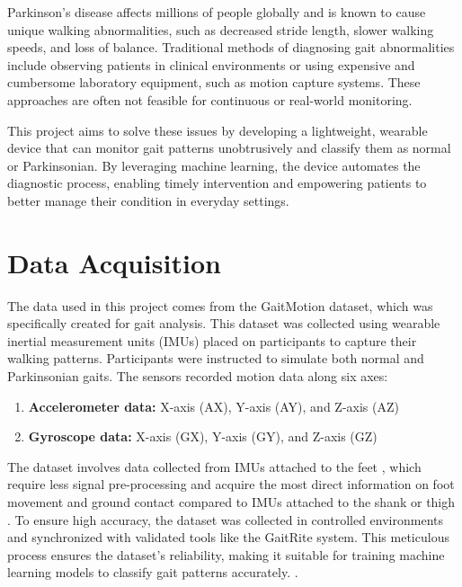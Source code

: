 Parkinson’s disease affects millions of people globally and is known to cause unique walking abnormalities, such as decreased stride length, slower walking speeds, and loss of balance.\cite{Hausdorff:2009} Traditional methods of diagnosing gait abnormalities include observing patients in clinical environments or using expensive and cumbersome laboratory equipment, such as motion capture systems. These approaches are often not feasible for continuous or real-world monitoring.\cite{ZhangWenwen:2022}

This project aims to solve these issues by developing a lightweight, wearable device that can monitor gait patterns unobtrusively and classify them as normal or Parkinsonian. By leveraging machine learning, the device automates the diagnostic process, enabling timely intervention and empowering patients to better manage their condition in everyday settings.\cite{Panebianco:2018}


\section{Data Acquisition}

The data used in this project comes from the GaitMotion dataset, which was specifically created for gait analysis. This dataset was collected using wearable inertial measurement units (IMUs) placed on participants to capture their walking patterns. Participants were instructed to simulate both normal and Parkinsonian gaits. The sensors recorded motion data along six axes:
\begin{enumerate}
	
	\item \textbf{Accelerometer data:} X-axis (AX), Y-axis (AY), and Z-axis (AZ)
	\item \textbf{Gyroscope data:} X-axis (GX), Y-axis (GY), and Z-axis (GZ) 
\end{enumerate}

The dataset involves data collected from IMUs attached to the feet \cite{Bamberg:2008}, which require less signal pre-processing and acquire the most direct information on foot movement and ground contact compared to IMUs attached to the shank or thigh\cite{Panebianco:2018} . To ensure high accuracy, the dataset was collected in controlled environments and synchronized with validated tools like the GaitRite system. This meticulous process ensures the dataset’s reliability, making it suitable for training machine learning models to classify gait patterns accurately.
\cite{ZhangWenwen:2022}.


